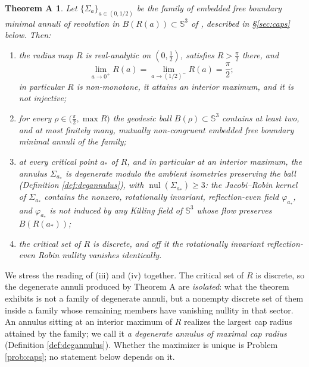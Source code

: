 \documentclass[11pt,a4paper]{amsart}
\theoremstyle{plain}
\newtheorem*{thmA}{Theorem A}
\theoremstyle{definition}
\newcommand{\Sph}{\mathbb{S}}
\newcommand{\nul}{\operatorname{nul}}
\begin{document}
\begin{thmA}
Let $\{\Sigma_a\}_{a\in(0,1/2)}$ be the family of embedded free boundary minimal annuli of revolution in $B(R(a))\subset\Sph^3$ of \textup{\cite[Prop. 3.3 and Prop. 3.4]{dO24}}, described in \S\textup{\ref{sec:caps}} below. Then:
\begin{enumerate}
\item[\textup{(i)}] the radius map $R$ is real-analytic on $(0,\tfrac12)$, satisfies $R>\tfrac\pi2$ there, and
\[
\lim_{a\to 0^+}R(a)=\lim_{a\to (1/2)^-}R(a)=\frac\pi2 ;
\]
in particular $R$ is non-monotone, it attains an interior maximum, and it is not injective;
\item[\textup{(ii)}] for every $\rho\in\bigl(\tfrac\pi2,\max R\bigr)$ the geodesic ball $B(\rho)\subset\Sph^3$ contains at least two, and at most finitely many, mutually non-congruent embedded free boundary minimal annuli of the family;
\item[\textup{(iii)}] at every critical point $a_*$ of $R$, and in particular at an interior maximum, the annulus $\Sigma_{a_*}$ is degenerate modulo the ambient isometries preserving the ball (Definition \ref{def:degannulus}), with $\nul(\Sigma_{a_*})\geq 3$: the Jacobi--Robin kernel of $\Sigma_{a_*}$ contains the nonzero, rotationally invariant, reflection-even field $\varphi_{a_*}$, and $\varphi_{a_*}$ is \emph{not} induced by any Killing field of $\Sph^3$ whose flow preserves $B(R(a_*))$;
\item[\textup{(iv)}] the critical set of $R$ is discrete, and off it the rotationally invariant reflection-even Robin nullity vanishes identically.
\end{enumerate}
\end{thmA}

We stress the reading of (iii) and (iv) together. The critical set of $R$ is discrete, so the degenerate annuli produced by Theorem A are \emph{isolated}: what the theorem exhibits is not a family of degenerate annuli, but a nonempty discrete set of them inside a family whose remaining members have vanishing nullity in that sector. An annulus sitting at an interior maximum of $R$ realizes the largest cap radius attained by the family; we call it \emph{a degenerate annulus of maximal cap radius} (Definition \ref{def:degannulus}). Whether the maximizer is unique is Problem \ref{prob:caps}; no statement below depends on it.
\end{document}
